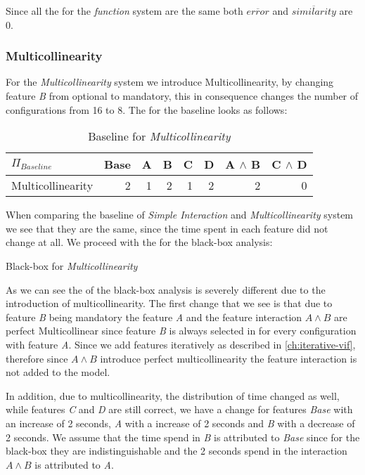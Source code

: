 Since all the {\perfInfluenceModel} for the \emph{function} system are the same both $\overline{error}$ and $\overline{similarity}$ 
are 0.

\subsubsection*{Multicollinearity}
For the \emph{Multicollinearity} system we introduce Multicollinearity, by changing feature \emph{B} from optional to mandatory,
this in consequence changes the number of configurations from 16 to 8. The {\perfInfluenceModel} for
the baseline looks as follows:

\begin{table}[H]
    \centering
    \begin{tabular}{lrrrrrrr}   
    \toprule
    $\Pi_{Baseline}$    & Base & A & B & C & D & A $\land$ B & C $\land$ D  \\
    \midrule
    Multicollinearity &   2 &  1 &  2 &  1 &  2 &   2 &  0 \\
    \bottomrule
    \end{tabular}
    \caption{Baseline {\perfInfluenceModel} for \emph{Multicollinearity}}
\end{table}

When comparing the baseline {\perfInfluenceModel} of \emph{Simple Interaction} and \emph{Multicollinearity} system 
we see that they are the same, since the time spent in each feature did not change at all. We proceed with 
the {\perfInfluenceModel} for the black-box analysis:

\begin{table}[H]
    \centering
    
    \caption{Black-box {\perfInfluenceModel} for \emph{Multicollinearity}}
\end{table}

As we can see the {\perfInfluenceModel} of the black-box analysis is severely different due to the introduction of multicollinearity.
The first change that we see is that due to feature \emph{B} being mandatory the feature \emph{A} and the feature interaction
$A \land B$ are perfect Multicollinear since feature \emph{B} is always selected in for every configuration with feature \emph{A}.
Since we add features iteratively as described in \autoref{ch:iterative-vif}, therefore since $A \land B$ introduce perfect
multicollinearity the feature interaction is not added to the model. 

In addition, due to multicollinearity, the distribution of time changed as well, while features \emph{C} and \emph{D} are still
correct, we have a change for features \emph{Base} with an increase of 2 seconds, \emph{A} with a increase of 2 seconds and
\emph{B} with a decrease of 2 seconds. We assume that the time spend in \emph{B} is attributed to \emph{Base} since for the 
black-box they are indistinguishable and the 2 seconds spend in the interaction $A \land B$ is attributed to \emph{A}.

